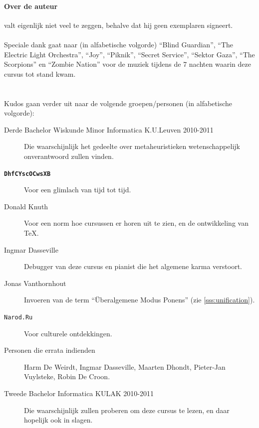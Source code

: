 \documentclass[titlepage,a4paper,twoside]{article}
\begin{document}
\begin{it}
\paragraph{Over de auteur} valt eigenlijk niet veel te zeggen, behalve dat hij geen exemplaren signeert.
\\\\
Speciale dank gaat naar (in alfabetische volgorde) ``Blind Guardian'', ``The Electric Light Orchestra'', ``Joy'', ``Piknik'', ``Secret Service'', ``Sektor Gaza'', ``The Scorpions'' en ``Zombie Nation'' voor de muziek tijdens de 7 nachten waarin deze cursus tot stand kwam.
\\\\\\
Kudos gaan verder uit naar de volgende groepen/personen (in alfabetische volgorde):
\begin{description}
 \item[Derde Bachelor Wiskunde Minor Informatica K.U.Leuven 2010-2011] Die waarschijnlijk het gedeelte over metaheuristieken wetenschappelijk onverantwoord zullen vinden.
 \item[\textbf{\texttt{DhfCYscOCwsXB}}] Voor een glimlach van tijd tot tijd.
 \item[Donald Knuth] Voor een norm hoe cursussen er horen uit te zien, en de ontwikkeling van \TeX{}.
 \item[Ingmar Dasseville] Debugger van deze cursus en pianist die het algemene karma verstoort.
 \item[Jonas Vanthornhout] Invoeren van de term ``Überalgemene Modus Ponens'' (zie \ref{sss:unification}).
 \item[\texttt{Narod.Ru}] Voor culturele ontdekkingen.
 \item[Personen die errata indienden] Harm De Weirdt, Ingmar Dasseville, Maarten Dhondt, Pieter-Jan Vuylsteke, Robin De Croon.
 \item[Tweede Bachelor Informatica KULAK 2010-2011] Die waarschijnlijk zullen proberen om deze cursus te lezen, en daar hopelijk ook in slagen.
\end{description}
\end{it}








% 
\appendix

\newpage
\listoffigures
\newpage
\printindex
\newpage
\end{document}
